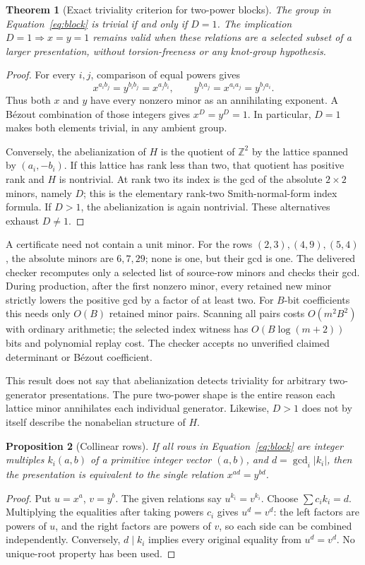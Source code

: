 \documentclass[11pt]{article}
\newtheorem{theorem}{Theorem}[section]
\newtheorem{proposition}[theorem]{Proposition}
\theoremstyle{definition}\newtheorem{definition}[theorem]{Definition}
\theoremstyle{remark}\newtheorem{remark}[theorem]{Remark}
\newcommand{\Z}{\mathbb Z}\newcommand{\Q}{\mathbb Q}\newcommand{\F}{\mathbb F}
\begin{document}
\begin{theorem}[Exact triviality criterion for two-power blocks]
\label{thm:minors}
The group in Equation~\eqref{eq:block} is trivial if and only if $D=1$.
The implication $D=1\Rightarrow x=y=1$ remains valid when these relations
are a selected subset of a larger presentation, without torsion-freeness
or any knot-group hypothesis.
\end{theorem}
\begin{proof}
For every $i,j$, comparison of equal powers gives
\[
 x^{a_i b_j}=y^{b_i b_j}=x^{a_j b_i},
 \qquad
 y^{b_i a_j}=x^{a_i a_j}=y^{b_j a_i}.
\]
Thus both $x$ and $y$ have every nonzero minor as an annihilating exponent.
A B\'ezout combination of those integers gives $x^D=y^D=1$. In particular,
$D=1$ makes both elements trivial, in any ambient group.

Conversely, the abelianization of $H$ is the quotient of $\Z^2$ by the
lattice spanned by $(a_i,-b_i)$. If this lattice has rank less than two,
that quotient has positive rank and $H$ is nontrivial. At rank two its
index is the gcd of the absolute $2\times2$ minors, namely $D$; this is
the elementary rank-two Smith-normal-form index formula. If $D>1$, the
abelianization is again nontrivial. These alternatives exhaust $D\ne1$.
\end{proof}

A certificate need not contain a unit minor. For the rows
$(2,3),(4,9),(5,4)$, the absolute minors are $6,7,29$; none is one,
but their gcd is one. The delivered checker recomputes only a selected
list of source-row minors and checks their gcd. During production, after
the first nonzero minor, every retained new minor strictly lowers the
positive gcd by a factor of at least two. For $B$-bit coefficients this
needs only $O(B)$ retained minor pairs. Scanning all pairs costs
$O(m^2B^2)$ with ordinary arithmetic; the selected index witness has
$O(B\log(m+2))$ bits and polynomial replay cost. The checker accepts no
unverified claimed determinant or B\'ezout coefficient.

This result does not say that abelianization detects triviality for
arbitrary two-generator presentations. The pure two-power shape is the
entire reason each lattice minor annihilates each individual generator.
Likewise, $D>1$ does not by itself describe the nonabelian structure of $H$.

\begin{proposition}[Collinear rows]\label{prop:collinear}
If all rows in Equation~\eqref{eq:block} are integer multiples
$k_i(a,b)$ of a primitive integer vector $(a,b)$, and
$d=\gcd_i|k_i|$, then the presentation is equivalent to the single relation
$x^{ad}=y^{bd}$.
\end{proposition}
\begin{proof}
Put $u=x^a$, $v=y^b$. The given relations say $u^{k_i}=v^{k_i}$.
Choose $\sum c_i k_i=d$. Multiplying the equalities after taking powers
$c_i$ gives $u^d=v^d$: the left factors are powers of $u$, and the right
factors are powers of $v$, so each side can be combined independently.
Conversely, $d\mid k_i$ implies every original equality from $u^d=v^d$.
No unique-root property has been used.
\end{proof}
\end{document}
